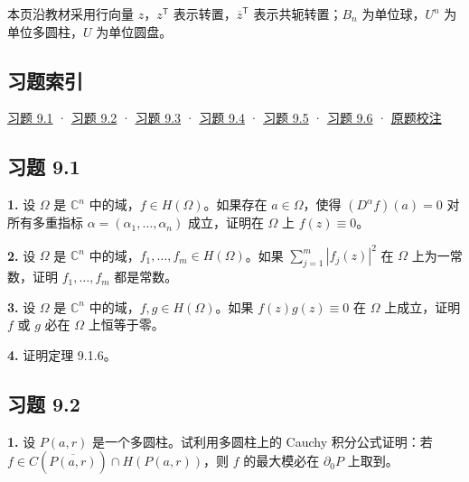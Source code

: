 \documentclass[11pt,a4paper]{article}
\begin{document}
本页沿教材采用行向量 \(z\)，\(z^{\mathsf T}\)
表示转置，\(\overline z^{\mathsf T}\) 表示共轭转置；\(B_n\)
为单位球，\(U^n\) 为单位多圆柱，\(U\) 为单位圆盘。

\subsection*{习题索引}\label{ch09-practice-heading-1}

\hyperref[ch09-practice-heading-2]{习题 9.1} · \hyperref[ch09-practice-heading-3]{习题 9.2} ·
\hyperref[ch09-practice-heading-4]{习题 9.3} · \hyperref[ch09-practice-heading-5]{习题 9.4} ·
\hyperref[ch09-practice-heading-6]{习题 9.5} · \hyperref[ch09-practice-heading-7]{习题 9.6} ·
\hyperref[ch09-practice-heading-8]{原题校注}

\subsection{习题 9.1}\label{ch09-practice-heading-2}

\par{}
\noindent\textbf{1.} 设 \(\Omega\) 是 \(\mathbb C^n\)
中的域，\(f\in H(\Omega)\)。如果存在 \(a\in\Omega\)，使得
\((D^\alpha f)(a)=0\) 对所有多重指标
\(\alpha=(\alpha_1,\ldots,\alpha_n)\) 成立，证明在 \(\Omega\) 上
\(f(z)\equiv0\)。

\par{}
\noindent\textbf{2.} 设 \(\Omega\) 是 \(\mathbb C^n\)
中的域，\(f_1,\ldots,f_m\in H(\Omega)\)。如果 \(\sum_{j=1}^m|f_j(z)|^2\)
在 \(\Omega\) 上为一常数，证明 \(f_1,\ldots,f_m\) 都是常数。

\par{}
\noindent\textbf{3.} 设 \(\Omega\) 是 \(\mathbb C^n\)
中的域，\(f,g\in H(\Omega)\)。如果 \(f(z)g(z)\equiv0\) 在 \(\Omega\)
上成立，证明 \(f\) 或 \(g\) 必在 \(\Omega\) 上恒等于零。

\par{}
\noindent\textbf{4.} 证明定理 9.1.6。

\subsection{习题 9.2}\label{ch09-practice-heading-3}

\par{}
\noindent\textbf{1.} 设 \(P(a,r)\) 是一个多圆柱。试利用多圆柱上的 Cauchy
积分公式证明：若 \(f\in C(\overline{P(a,r)})\cap H(P(a,r))\)，则 \(f\)
的最大模必在 \(\partial_0P\) 上取到。
\end{document}
